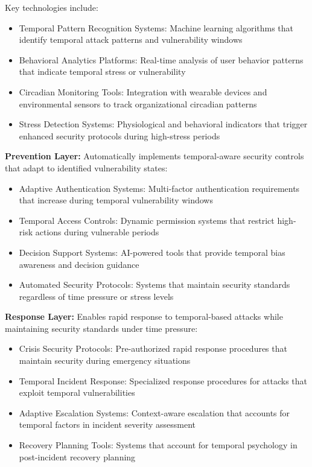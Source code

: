 \documentclass[11pt,a4paper]{article}
\begin{document}
Key technologies include:
\begin{itemize}
\item Temporal Pattern Recognition Systems: Machine learning algorithms that identify temporal attack patterns and vulnerability windows
\item Behavioral Analytics Platforms: Real-time analysis of user behavior patterns that indicate temporal stress or vulnerability
\item Circadian Monitoring Tools: Integration with wearable devices and environmental sensors to track organizational circadian patterns
\item Stress Detection Systems: Physiological and behavioral indicators that trigger enhanced security protocols during high-stress periods
\end{itemize}

\textbf{Prevention Layer:} Automatically implements temporal-aware security controls that adapt to identified vulnerability states:
\begin{itemize}
\item Adaptive Authentication Systems: Multi-factor authentication requirements that increase during temporal vulnerability windows
\item Temporal Access Controls: Dynamic permission systems that restrict high-risk actions during vulnerable periods
\item Decision Support Systems: AI-powered tools that provide temporal bias awareness and decision guidance
\item Automated Security Protocols: Systems that maintain security standards regardless of time pressure or stress levels
\end{itemize}

\textbf{Response Layer:} Enables rapid response to temporal-based attacks while maintaining security standards under time pressure:
\begin{itemize}
\item Crisis Security Protocols: Pre-authorized rapid response procedures that maintain security during emergency situations
\item Temporal Incident Response: Specialized response procedures for attacks that exploit temporal vulnerabilities
\item Adaptive Escalation Systems: Context-aware escalation that accounts for temporal factors in incident severity assessment
\item Recovery Planning Tools: Systems that account for temporal psychology in post-incident recovery planning
\end{itemize}
\end{document}
